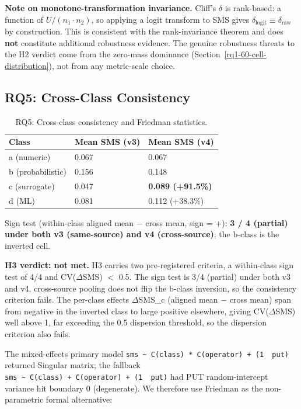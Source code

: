 \documentclass[12pt]{article}
\begin{document}
\textbf{Note on monotone-transformation invariance.} Cliff's $\delta$ is
rank-based: a function of $U / (n_1 \cdot n_2)$, so applying a logit transform to
SMS gives $\delta_{\mathrm{logit}} \equiv \delta_{\mathrm{raw}}$ by construction. This is consistent with the
rank-invariance theorem and does \textbf{not} constitute additional
robustness evidence. The genuine robustness threats to the H2 verdict
come from the zero-mass dominance (Section~\ref{rq1-60-cell-distribution}), not from any metric-scale
choice.

\subsection{RQ5: Cross-Class Consistency}\label{rq3-cross-class-consistency-and-friedman}

{\def\LTcaptype{table} %
\begin{longtable}[]{@{}lll@{}}
\caption{RQ5: Cross-class consistency and Friedman statistics.}\label{tab:p2-12}\\
\toprule\noalign{}
Class & Mean SMS (v3) & Mean SMS (v4) \\
\midrule\noalign{}
\endfirsthead
\endhead
\bottomrule\noalign{}
\endlastfoot
a (numeric) & 0.067 & 0.067 \\
b (probabilistic) & 0.156 & 0.148 \\
c (surrogate) & 0.047 & \textbf{0.089 (+91.5\%)} \\
d (ML) & 0.081 & 0.112 (+38.3\%) \\
\end{longtable}
}

Sign test (within-class aligned mean − cross mean, sign = +): \textbf{3
/ 4 (partial) under both v3 (same-source) and v4 (cross-source)}; the
b-class is the inverted cell.

\textbf{H3 verdict: not met.} H3 carries two pre-registered criteria, a
within-class sign test of 4/4 and CV($\Delta$SMS) $<$ 0.5. The sign test
is 3/4 (partial) under both v3 and v4, cross-source pooling does not
flip the b-class inversion, so the consistency criterion fails. The
per-class effects $\Delta$SMS\_c (aligned mean $-$ cross mean) span from
negative in the inverted class to large positive elsewhere, giving
CV($\Delta$SMS) well above 1, far exceeding the 0.5 dispersion threshold,
so the dispersion criterion also fails.

The mixed-effects primary model
\texttt{sms\ \textasciitilde{}\ C(class)\ *\ C(operator)\ +\ (1\ \textbar{}\ put)}
returned Singular matrix; the fallback
\texttt{sms\ \textasciitilde{}\ C(class)\ +\ C(operator)\ +\ (1\ \textbar{}\ put)}
had PUT random-intercept variance hit boundary 0 (degenerate). We
therefore use Friedman as the non-parametric formal alternative:
\end{document}
